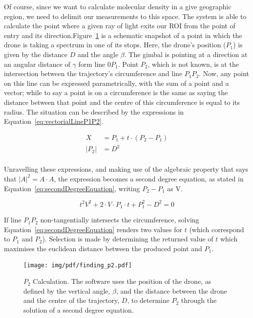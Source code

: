 Of course, since we want to calculate molecular density in a give
geographic region, we need to delimit our measurements to this space.
The system is able to calculate the point where a given ray of light
exits our \gls{ROI} from the point of entry and its
direction.Figure~\ref{fig:p2_calculation} is a schematic snapshot of a
point in which the drone is taking a spectrum in one of its stops. Here,
the drone's position ($P_1$) is given by the distance $D$ and the angle
$\beta$. The gimbal is pointing at a direction at an angular distance of
$\gamma$ form line $0P_1$. Point $P_2$, which is not known, is at the
intersection between the trajectory's circumference and line $P_1P_2$.
Now, any point on this line can be expressed parametrically, with the
sum of a point and a vector; while to say a point is on a circumference
is the same as saying the distance between that point and the centre of
this circumference is equal to its radius. The situation can be
described by the expressions in Equation~\ref{eq:vectorialLineP1P2}.

\begin{equation}
    \label{eq:vectorialLineP1P2}
    \begin{aligned}
        X &= P_1 + t \cdot (P_2 - P_1)\\
    |P_2| &= D^2\\ 
    \end{aligned}
\end{equation}

Unravelling these expressions, and making use of the algebraic property
that says that $|A|^2 = A \cdot A$, the expression becomes a second
degree equation, as stated in Equation~\ref{eq:secondDegreeEquation},
writing $P_2 - P_1$ as V.

\begin{equation}
    \label{eq:secondDegreeEquation}
    t^2V^2 + 2 \cdot V \cdot P_1 \cdot t + P_{1}^2 - D^2 = 0
\end{equation}

If line $P_1P_2$ non-tangentially intersects the circumference, solving
Equation~\ref{eq:secondDegreeEquation} renders two values for $t$ (which
correspond to $P_1$ and $P_2$). Selection is made by determining the
returned value of $t$ which maximises the euclidean distance between the
produced point and $P_1$.


\begin{figure}[htb]
    \centering
    \texttt{[image: img/pdf/finding\_p2.pdf]}
    \caption{$P_2$ Calculation. The software uses the position of the
    drone, as defined by the vertical angle, $\beta$, and the distance between
    the drone and the centre of the trajectory, $D$, to determine $P_2$
    through the solution of a second degree equation.}\label{fig:p2_calculation}
\end{figure}

